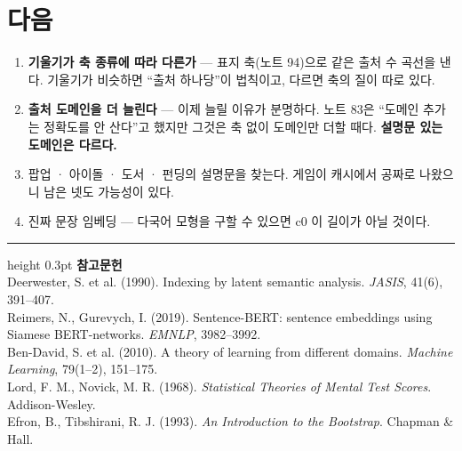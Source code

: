 \documentclass[10pt]{article}
\begin{document}
\section{다음}

\begin{enumerate}[leftmargin=1.3em,itemsep=0.15em]
\item \textbf{기울기가 축 종류에 따라 다른가} --- 표지 축(노트 94)으로 같은
      출처 수 곡선을 낸다. 기울기가 비슷하면 ``출처 하나당''이 법칙이고,
      다르면 축의 질이 따로 있다.
\item \textbf{출처 도메인을 더 늘린다} --- 이제 늘릴 이유가 분명하다. 노트 83은
      ``도메인 추가는 정확도를 안 산다''고 했지만 그것은 축 없이 도메인만
      더할 때다. \textbf{설명문 있는 도메인은 다르다.}
\item 팝업 · 아이돌 · 도서 · 펀딩의 설명문을 찾는다. 게임이 캐시에서 공짜로
      나왔으니 남은 넷도 가능성이 있다.
\item 진짜 문장 임베딩 --- 다국어 모형을 구할 수 있으면 c0 이 길이가 아닐
      것이다.
\end{enumerate}

\vspace{0.6em}
\hrule height 0.3pt
\vspace{0.5em}
{\footnotesize
\textbf{참고문헌}\\[0.3em]
Deerwester, S. et al. (1990). Indexing by latent semantic analysis.
\emph{JASIS}, 41(6), 391--407.\\[0.15em]
Reimers, N., Gurevych, I. (2019). Sentence-BERT: sentence embeddings using
Siamese BERT-networks. \emph{EMNLP}, 3982--3992.\\[0.15em]
Ben-David, S. et al. (2010). A theory of learning from different domains.
\emph{Machine Learning}, 79(1--2), 151--175.\\[0.15em]
Lord, F. M., Novick, M. R. (1968). \emph{Statistical Theories of Mental Test
Scores}. Addison-Wesley.\\[0.15em]
Efron, B., Tibshirani, R. J. (1993). \emph{An Introduction to the Bootstrap}.
Chapman \& Hall.
}
\end{document}
